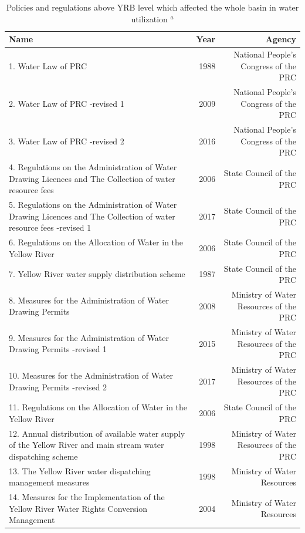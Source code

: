 \documentclass[9pt,twoside,lineno]{pnas-new}
\begin{document}

\begin{table}\centering
    \caption{Policies and regulations above YRB level which affected the whole basin in water utilization $^a$}

    \begin{tabular}{lrr}
    Name & Year & Agency \\
    \midrule
    1. Water Law of PRC & 1988 & National People's Congress of the PRC \\
    2. Water Law of PRC -revised 1 & 2009 & National People's Congress of the PRC \\
    3. Water Law of PRC -revised 2 & 2016 & National People's Congress of the PRC \\
    4. Regulations on the Administration of Water Drawing Licences and The Collection of water resource fees & 2006 & State Council of the PRC \\
    5. Regulations on the Administration of Water Drawing Licences and The Collection of water resource fees -revised 1 & 2017 & State Council of the PRC \\
    6. Regulations on the Allocation of Water in the Yellow River & 2006 & State Council of the PRC \\
    7. Yellow River water supply distribution scheme & 1987 & State Council of the PRC \\
    8. Measures for the Administration of Water Drawing Permits & 2008 & Ministry of Water Resources of the PRC \\
    9. Measures for the Administration of Water Drawing Permits -revised 1 & 2015 & Ministry of Water Resources of the PRC \\
    10. Measures for the Administration of Water Drawing Permits -revised 2 & 2017 & Ministry of Water Resources of the PRC \\
    11. Regulations on the Allocation of Water in the Yellow River & 2006 & State Council of the PRC \\
    12. Annual distribution of available water supply of the Yellow River and main stream water dispatching scheme & 1998 & Ministry of Water Resources of the PRC \\
    13. The Yellow River water dispatching management measures & 1998 & Ministry of Water Resources \\
    14. Measures for the Implementation of the Yellow River Water Rights Conversion Management & 2004 & Ministry of Water Resources \\

\end{tabular}
\end{table}
\end{document}
